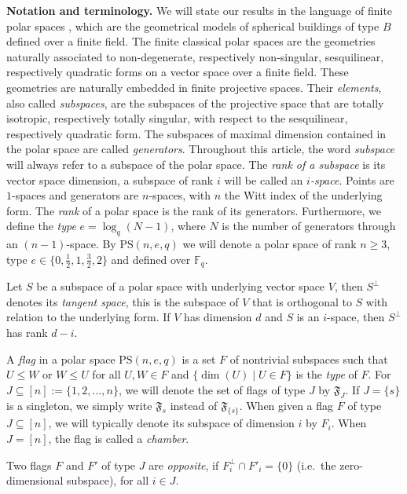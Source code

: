 \documentclass[11pt]{article}
\newcommand{\PS}{\mathrm{PS}}
\newcommand{\cF}{\mathfrak{F}}
\renewcommand{\le}{\leqslant}
\renewcommand{\geq}{\geqslant}
\begin{document}
\textbf{Notation and terminology.} We will state our results in the language of finite polar spaces \cite{distance-regular-graphs, Cameron}, which are the geometrical models of spherical buildings of type $B$ defined over a finite field. The finite classical polar spaces are the geometries naturally associated to non-degenerate, respectively non-singular, sesquilinear, respectively quadratic forms on a vector space over a finite field. These geometries are naturally embedded in finite projective spaces. Their {\em elements}, also called {\em subspaces}, are the subspaces of the projective space that are totally isotropic, respectively totally singular, with respect to the sesquilinear, respectively quadratic form. The subspaces of maximal dimension contained in the polar space are called {\em generators}. Throughout this article, the word {\em subspace} will always refer to a subspace of the polar space. The {\em rank of a subspace} is its vector space dimension, a subspace of rank $i$ will be called an {\em $i$-space}. Points are $1$-spaces and generators are $n$-spaces, with $n$ the Witt index of the underlying form. The {\em rank} of a polar space is the rank of its generators. Furthermore, we define the {\em type} $e = \log_q (N-1)$, where $N$ is the number of generators through an $(n-1)$-space. By $\PS(n,e,q)$ we will denote a polar space of rank $n \geq 3$, type $e \in \{0,\frac{1}{2},1,\frac{3}{2},2\}$ and defined over $\mathbb{F}_q$. 

Let $S$ be a subspace of a polar space with underlying vector space $V$, then $S^\perp$ denotes its {\em tangent space}, this is the subspace of $V$ that is orthogonal to $S$ with relation to the underlying form. If $V$ has dimension $d$ and $S$ is an $i$-space, then $S^\perp$ has rank $d-i$.

A \emph{flag} in a polar space $\PS(n,e,q)$ is a set $F$ of nontrivial subspaces such that $U\le W$ or $W\le U$ for all $U,W\in F$ and $\{\dim(U)\mid U\in F\}$ is the \emph{type} of $F$. For $J \subseteq [n] := \{1,2,\ldots,n\}$, we will denote the set of flags of type $J$ by $\cF_J$. If $J=\{s\}$ is a singleton, we simply write $\cF_s$ instead of $\cF_{\{s\}}$. When given a flag $F$ of type $J \subseteq [n]$, we will typically denote its subspace of dimension $i$ by $F_i$. When $J = [n]$, the flag is called a \emph{chamber}.


Two flags $F$ and $F'$ of type $J$ are \emph{opposite}, if $F_i^\perp \cap F'_i =\{0\}$ (i.e.\ the zero-dimensional subspace), for all $i \in J$. 
\end{document}

